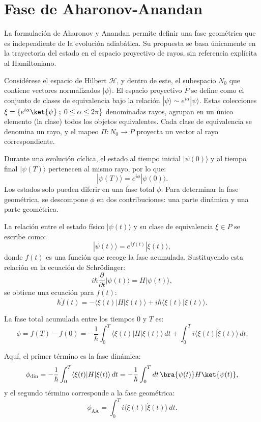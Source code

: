 \section{Fase de Aharonov-Anandan}\label{sec2:fase AA}

La formulación de Aharonov y Anandan permite definir una fase geométrica que es independiente de la evolución adiabática. Su propuesta se basa únicamente en la trayectoria del estado en el espacio proyectivo de rayos, sin referencia explícita al Hamiltoniano.

Considérese el espacio de Hilbert $\mathcal{H}$, y dentro de este, el subespacio \( N_0 \) que contiene vectores normalizados \( | \psi \rangle \). El espacio proyectivo \( P \) se define como el conjunto de clases de equivalencia bajo la relación \( | \psi \rangle \sim e^{i\alpha} | \psi \rangle \).  Estas colecciones $\xi = \{e^{i\alpha}\ket{\psi} \; ; \; 0 \leq \alpha \leq 2\pi\}$ denominadas rayos, agrupan en un \'unico elemento (la clase) todos los objetos equivalentes. Cada clase de equivalencia se denomina un rayo, y el mapeo \( \Pi : N_0 \to P \) proyecta un vector al rayo correspondiente.

Durante una evolución cíclica, el estado al tiempo inicial \( | \psi(0) \rangle \) y al tiempo final \( | \psi(T) \rangle \) pertenecen al mismo rayo, por lo que:
\[
| \psi(T) \rangle = e^{i\phi} | \psi(0) \rangle.
\]
Los estados solo pueden diferir en una fase total $\phi$. Para determinar la fase geométrica, se descompone \( \phi \) en dos contribuciones: una parte dinámica y una parte geométrica.

La relación entre el estado físico \( | \psi(t) \rangle \) y su clase de equivalencia \( \xi \in P \) se escribe como:
\[
| \psi(t) \rangle = e^{i f(t)} | \xi(t) \rangle,
\]
donde \( f(t) \) es una función que recoge la fase acumulada. Sustituyendo esta relación en la ecuación de Schrödinger:
\[
i \hbar \frac{\partial}{\partial t} | \psi(t) \rangle = H | \psi(t) \rangle,
\]
se obtiene una ecuación para \( f(t) \):
\[
\hbar \dot{f}(t) = -\langle \xi(t) | H | \xi(t) \rangle + i \hbar \langle \xi(t) | \dot{\xi}(t) \rangle.
\]

La fase total acumulada entre los tiempos \( 0 \) y \( T \) es:
\[
\phi = f(T) - f(0) = -\frac{1}{\hbar} \int_0^T \langle \xi(t) | H | \xi(t) \rangle \, dt + \int_0^T i \langle \xi(t) | \dot{\xi}(t) \rangle \, dt.
\]

Aquí, el primer término es la fase dinámica:
\[
\phi_{\text{din}} = -\frac{1}{\hbar} \int_0^T \langle \xi(t) | H | \xi(t) \rangle \, dt = -\frac{1}{\hbar}\int_0^T dt \, \bra{\psi(t)}H\ket{\psi(t)},
\]
y el segundo término corresponde a la fase geométrica:
\begin{equation} \label{eq:fg AA}
    \phi_{\text{AA}} = \int_0^T i \langle \xi(t) | \dot{\xi}(t) \rangle \, dt.
\end{equation}

